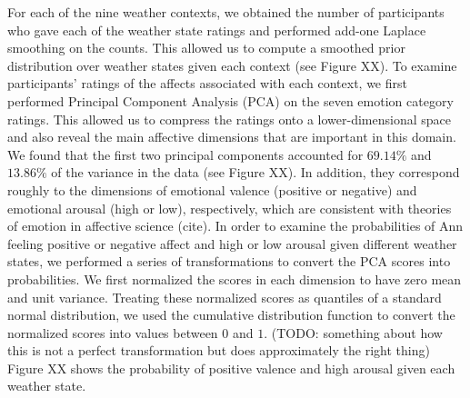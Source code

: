 \documentclass[10pt,letterpaper]{article}
\begin{document}
\begin{figure}[t]
\end{figure}
For each of the nine weather contexts, we obtained the number of participants who gave each of the weather state ratings and performed add-one Laplace smoothing on the counts. This allowed us to compute a smoothed prior distribution over weather states given each context (see Figure XX). 
%
To examine participants' ratings of the affects associated with each context, we first performed Principal Component Analysis (PCA) on the seven emotion category ratings. This allowed us to compress the ratings onto a lower-dimensional space and also reveal the main affective dimensions that are important in this domain. We found that the first two principal components accounted for $69.14\%$ and $13.86\%$ of the variance in the data (see Figure XX). In addition, they correspond roughly to the dimensions of emotional valence (positive or negative) and emotional arousal (high or low), respectively, which are consistent with theories of emotion in affective science (cite). In order to examine the probabilities of Ann feeling positive or negative affect and high or low arousal given different weather states, we performed a series of transformations to convert the PCA scores into probabilities. We first normalized the scores in each dimension to have zero mean and unit variance. Treating these normalized scores as quantiles of a standard normal distribution, we used the cumulative distribution function to convert the normalized scores into values between $0$ and $1$. (TODO: something about how this is not a perfect transformation but does approximately the right thing) Figure XX shows the probability of positive valence and high arousal given each weather state.
\end{document}
